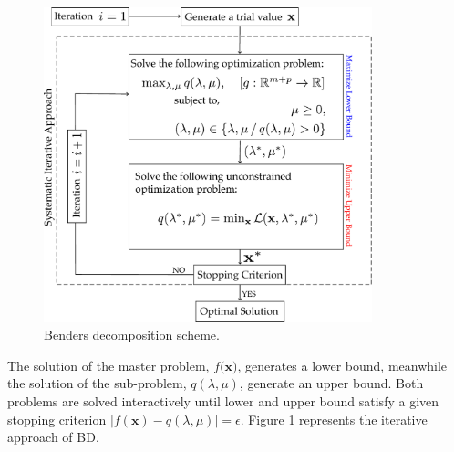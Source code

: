 \begin{figure}[H]
\centering
\includegraphics[width=0.85\textwidth]{Figures/BDScheme.pdf} 
\caption{Benders decomposition scheme.}
\label{fig:BDScheme}
\end{figure}
The solution of the master problem, $f(\textbf{x)}$, generates a lower bound, meanwhile the solution of the sub-problem, $q(\lambda, \mu)$, generate an upper bound. Both problems are solved interactively until lower and upper bound satisfy a given stopping criterion $|f(\textbf{x}) - q(\lambda, \mu)| = \epsilon$. Figure \ref{fig:BDScheme} represents the iterative approach of BD.
